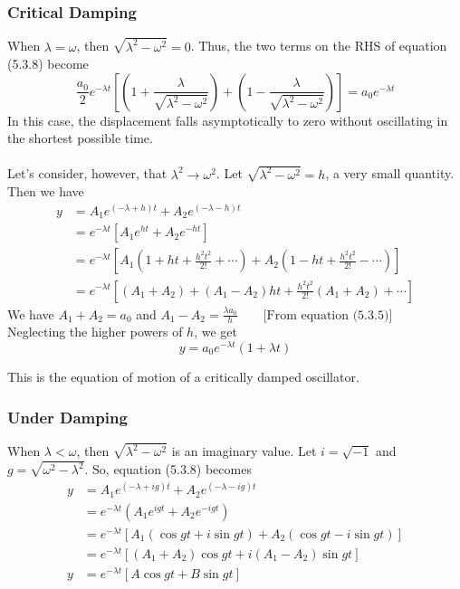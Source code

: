 \documentclass[12pt]{article}
\numberwithin{equation}{subsection}
\begin{document}
\subsubsection{Critical Damping}
When $\lambda = \omega$, then $\sqrt{\lambda^2-\omega^2} = 0$. Thus, the two terms on the RHS of equation (5.3.8) become \[
    \frac{a_0}{2} e^{-\lambda t} \left[ \left( 1 + \frac{\lambda}{\sqrt{\lambda^2-\omega^2}} \right) + \left( 1 - \frac{\lambda}{\sqrt{\lambda^2-\omega^2}} \right) \right] = a_0 e^{-\lambda t}
\]
In this case, the displacement falls asymptotically to zero without oscillating in the shortest possible time. \\~\\

Let's consider, however, that $\lambda^2 \to \omega^2$. Let $\sqrt{\lambda^2-\omega^2} = h$, a very small quantity. Then we have
\begin{align*}
    y &= A_1e^{(-\lambda+h)t} + A_2e^{(-\lambda-h)t} \\
    &= e^{-\lambda t} \left[ A_1e^{ht} + A_2e^{-ht} \right] \\
    &= e^{-\lambda t} \left[ A_1(1+ht+\frac{h^2t^2}{2!}+\cdots) + A_2(1-ht+\frac{h^2t^2}{2!}-\cdots) \right] \\
    &= e^{-\lambda t} \left[ (A_1+A_2) + (A_1-A_2)ht + \frac{h^2t^2}{2!}(A_1+A_2) + \cdots \right]
\end{align*}
We have $A_1 + A_2 = a_0$ and $\displaystyle A_1 - A_2 = \frac{\lambda a_0}{h} \qquad \text{[From equation (5.3.5)]}$ \\
Neglecting the higher powers of $h$, we get
\begin{equation}
    \boxed{ y = a_0 e^{-\lambda t} (1 + \lambda t) }
\end{equation}

This is the equation of motion of a critically damped oscillator. \\

\subsubsection{Under Damping}
When $\lambda < \omega$, then $\sqrt{\lambda^2-\omega^2}$ is an imaginary value. Let $i=\sqrt{-1}$ and $g=\sqrt{\omega^2-\lambda^2}$. So, equation (5.3.8) becomes
\begin{align*}
    y &= A_1e^{(-\lambda+ig)t} + A_2e^{(-\lambda-ig)t} \\
    &= e^{-\lambda t} (A_1e^{igt} + A_2e^{-igt}) \\
    &= e^{-\lambda t} \left[ A_1(\cos{gt}+i\sin{gt}) + A_2(\cos{gt}-i\sin{gt}) \right] \\
    &= e^{-\lambda t} \left[ (A_1+A_2)\cos{gt} + i(A_1-A_2)\sin{gt}\right ] \\
    y &= e^{-\lambda t} \left[ A \cos{gt} + B \sin{gt} \right]
\end{align*}
\end{document}
